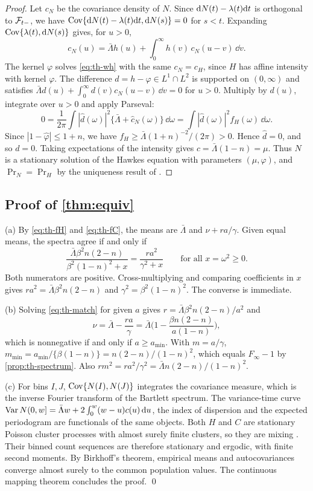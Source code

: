 \begin{proof}
Let $c_N$ be the covariance density of $N$. Since $\mathrm{d}N(t)-\lambda(t)\mathrm{d} t$ is
orthogonal to $\mathcal{F}_{t-}$, we have $\operatorname{Cov}\{\mathrm{d}N(t)-\lambda(t)\mathrm{d} t,\mathrm{d}N(s)\}=0$ for
$s<t$. Expanding $\operatorname{Cov}\{\lambda(t),\mathrm{d}N(s)\}$ gives, for $u>0$,
\begin{equation}\label{eq:th-wh}
c_N(u)=\bar\Lambda h(u)+\int_0^\infty h(v)\,c_N(u-v)\,\dd v .
\end{equation}
The kernel $\varphi$ solves \eqref{eq:th-wh} with the same $c_N=c_H$, since $H$ has
affine intensity with kernel $\varphi$. The difference $d=h-\varphi\in L^1\cap L^2$ is
supported on $(0,\infty)$ and satisfies
$\bar\Lambda d(u)+\int_0^\infty d(v)c_N(u-v)\,\dd v=0$ for $u>0$. Multiply by $d(u)$,
integrate over $u>0$ and apply Parseval:
\[
0=\frac1{2\pi}\int|\hat d(\omega)|^2\{\bar\Lambda+\hat c_N(\omega)\}\,\dd\omega
=\int|\hat d(\omega)|^2f_H(\omega)\,\dd\omega .
\]
Since $|1-\hat\varphi|\le1+n$, we have $f_H\ge\bar\Lambda(1+n)^{-2}/(2\pi)>0$. Hence
$\hat d=0$, and so $d=0$. Taking expectations of the intensity gives
$c=\bar\Lambda(1-n)=\mu$. Thus $N$ is a stationary solution of the Hawkes equation with
parameters $(\mu,\varphi)$, and $\Pr_N=\Pr_H$ by the uniqueness result of
\citet{bremaud1996}.
\end{proof}

\subsection{Proof of \texorpdfstring{\cref{thm:equiv}}{Theorem (equivalence)}}

(a) By \eqref{eq:th-fH} and \eqref{eq:th-fC}, the means are $\bar\Lambda$ and
$\nu+r a/\gamma$. Given equal means, the spectra agree if and only if
\[
\frac{\bar\Lambda\beta^2n(2-n)}{\beta^2(1-n)^2+x}=\frac{r a^2}{\gamma^2+x}
\qquad\text{for all }x=\omega^2\ge0 .
\]
Both numerators are positive. Cross-multiplying and comparing coefficients in $x$
gives $r a^2=\bar\Lambda\beta^2n(2-n)$ and $\gamma^2=\beta^2(1-n)^2$. The converse is
immediate.

(b) Solving \eqref{eq:th-match} for given $a$ gives
$r=\bar\Lambda\beta^2n(2-n)/a^2$ and
\[
\nu=\bar\Lambda-\frac{r a}{\gamma}
=\bar\Lambda\Big(1-\frac{\beta n(2-n)}{a(1-n)}\Big),
\]
which is nonnegative if and only if $a\ge a_{\min}$. With $m=a/\gamma$,
$m_{\min}=a_{\min}/\{\beta(1-n)\}=n(2-n)/(1-n)^2$, which equals $F_\infty-1$ by
\cref{prop:th-spectrum}. Also $r m^2=r a^2/\gamma^2=\bar\Lambda n(2-n)/(1-n)^2$.

(c) For bins $I,J$, $\operatorname{Cov}\{N(I),N(J)\}$ integrates the covariance measure, which is
the inverse Fourier transform of the Bartlett spectrum. The variance-time curve
$\operatorname{Var} N(0,w]=\bar\Lambda w+2\int_0^w(w-u)c(u)\,\mathrm{d} u$, the index of dispersion and the
expected periodogram are functionals of the same objects. Both $H$ and $C$ are
stationary Poisson cluster processes with almost surely finite clusters, so they are
mixing \citep[Ch.~12]{daley2008}. Their binned count sequences are therefore stationary
and ergodic, with finite second moments. By Birkhoff's theorem, empirical means and
autocovariances converge almost surely to the common population values. The
continuous mapping theorem concludes the proof. \qed

